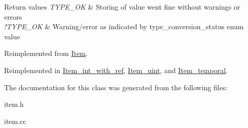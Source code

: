 \begin{DoxyRetVals}{Return values}
{\em T\+Y\+P\+E\+\_\+\+OK} & Storing of value went fine without warnings or errors \\
\hline
{\em !\+T\+Y\+P\+E\+\_\+\+OK} & Warning/error as indicated by type\+\_\+conversion\+\_\+status enum value \\
\hline
\end{DoxyRetVals}


Reimplemented from \mbox{\hyperlink{classItem_a463ded5f3c21ed2508dd8fddc6024722}{Item}}.



Reimplemented in \mbox{\hyperlink{classItem__int__with__ref_a3b0eb8a477df3718cd623935eaaa73de}{Item\+\_\+int\+\_\+with\+\_\+ref}}, \mbox{\hyperlink{classItem__uint_a91382bc23286fc3fcd9fdab10dce8567}{Item\+\_\+uint}}, and \mbox{\hyperlink{classItem__temporal_a12c4888e99d5a236550023180ec4f400}{Item\+\_\+temporal}}.



The documentation for this class was generated from the following files\+:\begin{DoxyCompactItemize}
\item 
item.\+h\item 
item.\+cc\end{DoxyCompactItemize}
